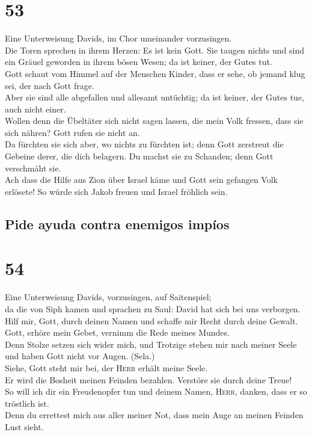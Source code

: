 \hypertarget{section-52}{%
\section{53}\label{section-52}}

 Eine Unterweisung Davids, im Chor umeinander
vorzusingen.\\
 Die Toren sprechen in ihrem Herzen: Es ist kein Gott. Sie
taugen nichts und sind ein Gräuel geworden in ihrem bösen Wesen; da ist
keiner, der Gutes tut.\\
 Gott schaut vom Himmel auf der Menschen Kinder, dass er
sehe, ob jemand klug sei, der nach Gott frage.\\
 Aber sie sind alle abgefallen und allesamt untüchtig; da
ist keiner, der Gutes tue, auch nicht einer.\\
 Wollen denn die Übeltäter sich nicht sagen lassen, die
mein Volk fressen, dass sie sich nähren? Gott rufen sie nicht an.\\
 Da fürchten sie sich aber, wo nichts zu fürchten ist;
denn Gott zerstreut die Gebeine derer, die dich belagern. Du machst sie
zu Schanden; denn Gott verschmäht sie.\\
 Ach dass die Hilfe aus Zion über Israel käme und Gott
sein gefangen Volk erlösete! So würde sich Jakob freuen und Israel
fröhlich sein.

\hypertarget{pide-ayuda-contra-enemigos-impuxedos}{%
\subsection{Pide ayuda contra enemigos
impíos}\label{pide-ayuda-contra-enemigos-impuxedos}}

\hypertarget{section-53}{%
\section{54}\label{section-53}}

 Eine Unterweisung Davids, vorzusingen, auf Saitenspiel;\\
 da die von Siph kamen und sprachen zu Saul: David hat
sich bei uns verborgen.\\
 Hilf mir, Gott, durch deinen Namen und schaffe mir Recht
durch deine Gewalt.\\
 Gott, erhöre mein Gebet, vernimm die Rede meines
Mundes.\\
 Denn Stolze setzen sich wider mich, und Trotzige stehen
mir nach meiner Seele und haben Gott nicht vor Augen. (Sela.)\\
 Siehe, Gott steht mir bei, der \textsc{Herr} erhält meine
Seele.\\
 Er wird die Bosheit meinen Feinden bezahlen. Verstöre sie
durch deine Treue!\\
 So will ich dir ein Freudenopfer tun und deinem Namen,
\textsc{Herr}, danken, dass er so tröstlich ist.\\
 Denn du errettest mich aus aller meiner Not, dass mein
Auge an meinen Feinden Lust sieht.

